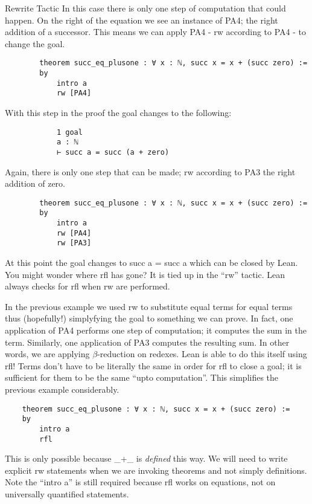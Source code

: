 \documentclass{book}
\begin{document}
\begin{eg}{Rewrite Tactic}
    In this case there is only one step of computation that could happen. On the right of the equation we see an instance of PA4; the right addition of a successor. This means we can apply PA4 - rw according to PA4 - to change the goal. 
    \begin{center}
        \begin{lstlisting}
        theorem succ_eq_plusone : ∀ x : ℕ, succ x = x + (succ zero) :=
        by
            intro a
            rw [PA4]
        \end{lstlisting}
    \end{center}
    With this step in the proof the goal changes to the following: 
    \begin{center}
        \begin{lstlisting}
            1 goal
            a : ℕ
            ⊢ succ a = succ (a + zero)
        \end{lstlisting}
    \end{center}
    Again, there is only one step that can be made; rw according to PA3 the right addition of zero. 
    \begin{center}
        \begin{lstlisting}
        theorem succ_eq_plusone : ∀ x : ℕ, succ x = x + (succ zero) :=
        by
            intro a
            rw [PA4]
            rw [PA3]
        \end{lstlisting}
    \end{center}
    At this point the goal changes to succ a = succ a which can be closed by Lean. You might wonder where rfl has gone? It is tied up in the ``rw'' tactic. Lean always checks for rfl when rw are performed. 

\end{eg}

In the previous example we used rw to substitute equal terms for equal terms thus (hopefully!) simplyfying the goal to something we can prove. In fact, one application of PA4 performs one step of computation; it computes the sum in the term. Similarly, one application of PA3 computes the resulting sum. In other words, we are applying $\beta$-reduction on redexes. Lean is able to do this itself using rfl! Terms don't have to be literally the same in order for rfl to close a goal; it is sufficient for them to be the same ``upto computation''. This simplifies the previous example considerably. 
\begin{center}
    \begin{lstlisting}
    theorem succ_eq_plusone : ∀ x : ℕ, succ x = x + (succ zero) :=
    by
        intro a
        rfl
    \end{lstlisting}
\end{center}
This is only possible because \_+\_ is \emph{defined} this way. We will need to write explicit rw statements when we are invoking theorems and not simply definitions. Note the ``intro a'' is still required because rfl works on equations, not on universally quantified statements. 
\end{document}
